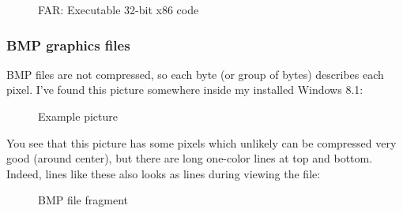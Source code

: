 \begin{figure}[H]
\centering
{}
\caption{FAR: Executable 32-bit x86 code}
\end{figure}


\clearpage
\subsubsection{BMP graphics files}


BMP files are not compressed, so each byte (or group of bytes) describes each pixel.
I've found this picture somewhere inside my installed Windows 8.1:

\begin{figure}[H]
\centering
{}
\caption{Example picture}
\end{figure}

You see that this picture has some pixels which unlikely can be compressed very good (around center), 
but there are long one-color lines at top and bottom.
Indeed, lines like these also looks as lines during viewing the file:

\begin{figure}[H]
\centering
{}
\caption{BMP file fragment}
\end{figure}

